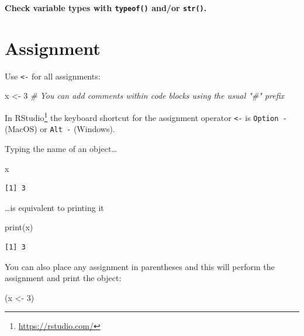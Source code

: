 \documentclass[
]{book}
\newenvironment{Shaded}{\begin{snugshade}}{\end{snugshade}}
\newcommand{\CommentTok}[1]{\textcolor[rgb]{0.56,0.35,0.01}{\textit{#1}}}
\newcommand{\DecValTok}[1]{\textcolor[rgb]{0.00,0.00,0.81}{#1}}
\newcommand{\FunctionTok}[1]{\textcolor[rgb]{0.00,0.00,0.00}{#1}}
\newcommand{\NormalTok}[1]{#1}
\newcommand{\OtherTok}[1]{\textcolor[rgb]{0.56,0.35,0.01}{#1}}
\DeclareRobustCommand{\href}[2]{#2\footnote{\url{#1}}}
\begin{document}
\begin{rmdtip}
\textbf{Check variable types with \texttt{typeof()} and/or
\texttt{str()}.}
\end{rmdtip}

\hypertarget{assignment}{%
\section{Assignment}\label{assignment}}

Use \texttt{\textless{}-} for all assignments:

\begin{Shaded}
\begin{Highlighting}[]
\NormalTok{x }\OtherTok{\textless{}{-}} \DecValTok{3}
\CommentTok{\# You can add comments within code blocks using the usual "\#" prefix}
\end{Highlighting}
\end{Shaded}

\begin{rmdtip}
In \href{https://rstudio.com/}{RStudio} the keyboard shortcut for the
assignment operator \texttt{\textless{}-} is \texttt{Option\ -} (MacOS)
or \texttt{Alt\ -} (Windows).
\end{rmdtip}

Typing the name of an object\ldots{}

\begin{Shaded}
\begin{Highlighting}[]
\NormalTok{x}
\end{Highlighting}
\end{Shaded}

\begin{verbatim}
[1] 3
\end{verbatim}

\ldots is equivalent to printing it

\begin{Shaded}
\begin{Highlighting}[]
\FunctionTok{print}\NormalTok{(x)}
\end{Highlighting}
\end{Shaded}

\begin{verbatim}
[1] 3
\end{verbatim}

You can also place any assignment in parentheses and this will perform the assignment and print the object:

\begin{Shaded}
\begin{Highlighting}[]
\NormalTok{(x }\OtherTok{\textless{}{-}} \DecValTok{3}\NormalTok{)}
\end{Highlighting}
\end{Shaded}
\end{document}

